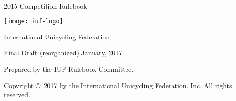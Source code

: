 \begin{titlepage}
\centering
\ \\
\vspace{5cm}
{\Huge 2015 Competition Rulebook}
\vspace{5mm}

\texttt{[image: iuf-logo]}

\vspace{5mm}
{\huge International Unicycling Federation}

\vspace{5mm}
{\Large Final Draft (reorganized) \quad January, 2017}

\vspace{50mm}
Prepared by the IUF Rulebook Committee.

\vspace{5mm}
{\small Copyright \copyright\ 2017 by the International Unicycling Federation, Inc. All rights reserved.}

\end{titlepage}
